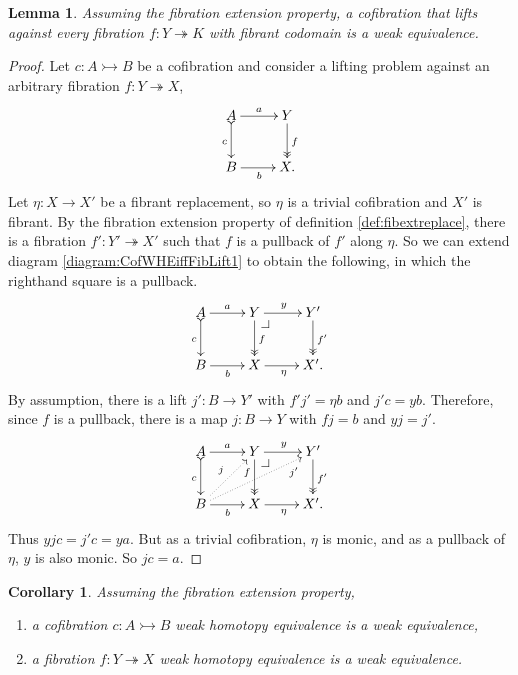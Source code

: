 \documentclass[11pt,reqno]{amsart}
\makeatletter
\newcommand{\mono}{\ensuremath{\rightarrowtail}}
\newcommand{\ra}{\ensuremath{\rightarrow}}
\newcommand{\onto}{\ensuremath{\twoheadrightarrow}}
\newtheorem{lemma}[theorem]{Lemma}
\newtheorem{corollary}[theorem]{Corollary}
\theoremstyle{remark}
\theoremstyle{definition}
\newcommand{\pbcorner}[1][dr]{\save*!/#1-1.2pc/#1:(-1,1)@^{|-}\restore}
\makeatother
\begin{document}
\begin{lemma}\label{lemma:CofWEiffFibLift}
Assuming the fibration extension property, a cofibration that lifts against every fibration $f : Y\onto K$ with fibrant codomain is a weak equivalence.
\end{lemma}

\begin{proof}
Let $c : A\mono B$ be a cofibration and consider a lifting problem against an arbitrary fibration $f: Y\onto X$,
\begin{equation}\label{diagram:CofWHEiffFibLift1}
\xymatrix{
A \ar@{>->}[d]_{c} \ar[r]^-{a}  & Y \ar@{>>}[d]^{f} \\
B \ar[r]_{b} &  X.
}
\end{equation}
Let $\eta: X\ra X'$ be a fibrant replacement, so $\eta$ is a trivial cofibration and $X'$ is fibrant. 
By the fibration extension property of definition \ref{def:fibextreplace}, there is a fibration $f' : Y' \onto X'$ such that $f$ is a pullback of $f'$ along $\eta$. So we can extend diagram \eqref{diagram:CofWHEiffFibLift1} to obtain the following, in which the righthand square is a pullback.
\begin{equation}\label{diagram:CofWHEiffFibLift2}
\xymatrix{
A \ar@{>->}[d]_{c} \ar[r]^-{a}  & Y \ar@{>>}[d]^{f} {\pbcorner} \ar[r]^{y} & Y' \ar@{>>}[d]^{f'} \\
B \ar[r]_{b} &  X  \ar[r]_\eta &  X'.
}
\end{equation}
By assumption, there is a lift $j' : B\ra Y'$ with $f' j' = \eta b$ and $j'c = yb$.  Therefore, since $f$ is a pullback, there is a map $j : B\ra Y$ with $fj = b$ and $y j = j'$.  
\begin{equation}\label{diagram:CofWHEiffFibLift3}
\xymatrix{
A \ar@{>->}[d]_{c} \ar[r]^-{a}  & Y \ar@{>>}[d]_<<<<{f} {\pbcorner} \ar[r]^{y} & Y' \ar@{>>}[d]^{f'} \\
B \ar[r]_{b} \ar@{..>}[ru]^{j} \ar@{..>}[rru]_>>>>{j'} &  X  \ar[r]_\eta &  X'.
}
\end{equation}
Thus $yjc = j'c = ya$.  But as a trivial cofibration, $\eta$ is monic, and as a pullback of $\eta$, $y$ is also monic. So $jc=a$.
\end{proof}

\begin{corollary}\label{cor:CofWHEtoWE}
Assuming the fibration extension property,  
\begin{enumerate}
\item a cofibration $c : A \mono B$ weak homotopy equivalence is a weak equivalence,
\item a fibration $ f : Y \onto X$ weak homotopy equivalence is a weak equivalence.
\end{enumerate}
\end{corollary}
\end{document}
